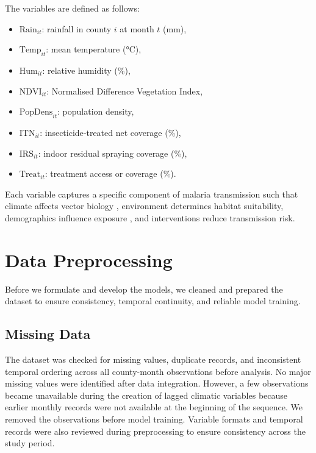 	The variables are defined as follows:
	\begin{itemize}
		\item \(\text{Rain}_{it}\): rainfall in county \(i\) at month \(t\) (mm),
		\item \(\text{Temp}_{it}\): mean temperature (°C),
		\item \(\text{Hum}_{it}\): relative humidity (\%),
		\item \(\text{NDVI}_{it}\): Normalised Difference Vegetation Index,
		\item \(\text{PopDens}_{it}\): population density,
		\item \(\text{ITN}_{it}\): insecticide‑treated net coverage (\%),
		\item \(\text{IRS}_{it}\): indoor residual spraying coverage (\%),
		 \item \(\text{Treat}_{it}\): treatment access or coverage (\%).
	\end{itemize}
	
	Each variable captures a specific component of malaria transmission such that climate affects vector biology \cite{Caminade2023}, environment determines habitat suitability, demographics influence exposure \cite{Chirebvu2014}, and interventions reduce transmission risk.
	

	\section{Data Preprocessing}
	
     Before we formulate and develop the models, we  cleaned and prepared  the dataset to ensure consistency, temporal continuity, and reliable model training.
	
	\subsection{Missing Data}
	
   The dataset was checked for missing values, duplicate records, and inconsistent temporal ordering across all county-month observations before analysis. No major missing values were identified after data integration. However, a few observations became unavailable during the creation of lagged climatic variables because earlier monthly records were not available at the beginning of the sequence. We removed  the observations before model training. Variable formats and temporal records were also reviewed during preprocessing to ensure consistency across the study period.

